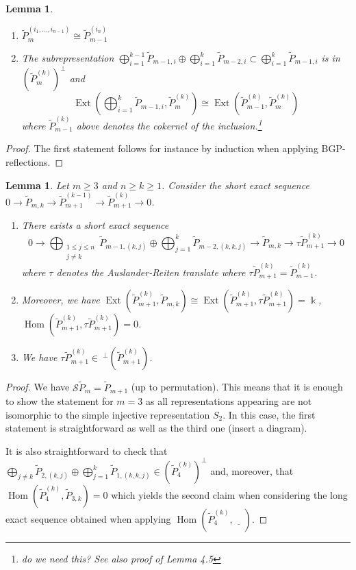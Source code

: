 \documentclass{amsart}
\newtheorem{lemma}[theorem]{Lemma}
\newcommand{\kk}{\Bbbk}
\newcommand{\Ext}{\operatorname{Ext}}
\newcommand{\Hom}{\operatorname{Hom}}
\newcommand{\ses}[3]{0\rightarrow #1\rightarrow #2\rightarrow#3\rightarrow 0}
\begin{document}
\begin{lemma}
  \begin{enumerate}
    \item $\tilde P_m^{(i_1,\ldots,i_{n-1})}\cong\tilde P_{m-1}^{(i_n)}$
    \item The subrepresentation $\bigoplus_{i=1}^{k-1}\tilde P_{m-1,i}\oplus\bigoplus_{i=1}^k\tilde P_{m-2,i}\subset\bigoplus_{i=1}^k\tilde P_{m-1,i}$ is in $(\tilde P_m^{(k)})^\perp$ and
      \[\Ext(\bigoplus_{i=1}^k\tilde P_{m-1,i},\tilde P_m^{(k)})\cong\Ext(\tilde P_{m-1}^{(k)},\tilde P_m^{(k)})\]
      where $\tilde P_{m-1}^{(k)}$ above denotes the cokernel of the inclusion.\footnote{do we need this? See also proof of Lemma 4.5}
  \end{enumerate}
\end{lemma}
\begin{proof}
The first statement follows for instance by induction when applying BGP-reflections.
\end{proof}
\begin{lemma}\label{AR}
Let $m\geq 3$ and $n\geq k\geq 1$. Consider the short exact sequence $\ses{\tilde P_{m,k}}{\tilde P_{m+1}^{(k-1)}}{\tilde P_{m+1}^{(k)}}$. 
\begin{enumerate}
\item There exists a short exact sequence 
\[\ses{\bigoplus_{\substack{1\leq j\leq n\\j\neq k}}\tilde P_{m-1,(k,j)}\oplus \bigoplus_{j=1}^k\tilde P_{m-2,(k,k,j)}}{\tilde P_{m,k}}{\tau\tilde P_{m+1}^{(k)}}\]
where $\tau$ denotes the Auslander-Reiten translate where
$\tau\tilde P_{m+1}^{(k)}=\tilde P_{m-1}^{(k)}$. 
\item Moreover, we have $\Ext(\tilde P_{m+1}^{(k)},\tilde P_{m,k})\cong \Ext(\tilde P_{m+1}^{(k)},\tau\tilde P_{m+1}^{(k)})=\kk$, $\Hom(\tilde P_{m+1}^{(k)},\tau\tilde P_{m+1}^{(k)})=0$. 
\item We have $\tau\tilde P_{m+1}^{(k)}\in ~^\perp(\tilde P_{m+1}^{(k)})$.
\end{enumerate}%
\end{lemma}
\begin{proof}
We have $\mathcal  S \tilde P_m=\tilde P_{m+1}$ (up to permutation). This means that it is enough to show the statement for $m=3$ as all representations appearing are not isomorphic to the simple injective representation $S_2$. In this case, the first statement is straightforward as well as the third one (insert a diagram).

It is also straightforward to check that $\bigoplus_{j\neq k}\tilde P_{2,(k,j)}\oplus \bigoplus_{j=1}^k\tilde P_{1,(k,k,j)}\in (\tilde P_{4}^{(k)})^\perp$ and, moreover, that $\Hom(\tilde P_{4}^{(k)},\tilde P_{3,k})=0$ which yields the second claim when considering the long exact sequence obtained when applying $\Hom(\tilde P_{4}^{(k)},\underline{\quad})$.


\end{proof}
\end{document}

